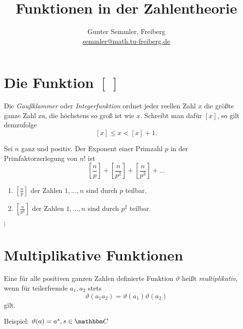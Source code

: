 \documentclass[11pt]{article}
\author{Gunter Semmler, Freiberg\\\url{semmler@math.tu-freiberg.de}}
\title{Funktionen in der Zahlentheorie\kosemnetlicensemark}
\date{}
\begin{document}
\maketitle         

\section{Die Funktion $[\,]$}
Die {\it Gau{\ss}klammer} oder {\it Integerfunktion} ordnet jeder reellen Zahl
$x$ die gr\"{o}{\ss}te ganze Zahl zu, die h\"{o}chstens so gro{\ss} ist wie
$x$. Schreibt man daf\"{u}r $[x]$, so gilt demzufolge
\[ [x]\leq x<[x]+1.\]
\begin{theorem}
\label{T1}
Sei $n$ ganz und positiv. Der Exponent einer Primzahl $p$ in der
Primfaktorzerlegung von $n!$ ist
\[\left[\frac{n}{p}\right]+\left[\frac{n}{p^2}\right]
+\left[\frac{n}{p^3}\right]+\ldots\] 
\end{theorem}
\begin{beweis}
  \begin{enumerate}
  \item[] $\left[\frac{n}{p}\right]$ der Zahlen $1,\ldots,n$ sind durch $p$
    teilbar.
  \item[] $\left[\frac{n}{p^2}\right]$ der Zahlen $1,\ldots,n$ sind durch $p^2$
    teilbar.
  \end{enumerate}
  \hspace*{5cm}$\vdots$
\end{beweis}

\section{Multiplikative Funktionen}
Eine f\"{u}r alle positiven ganzen Zahlen definierte Funktion $\vartheta$
hei{\ss}t {\it multiplikativ}, wenn f\"{u}r teilerfremde $a_1,a_2$ stets
\begin{equation}\label{1}
\vartheta(a_1 a_2)=\vartheta(a_1)\vartheta(a_2)\end{equation}
gilt.

\noindent Beispiel: $\vartheta(a)=a^s, s\in\C$
\end{document}
